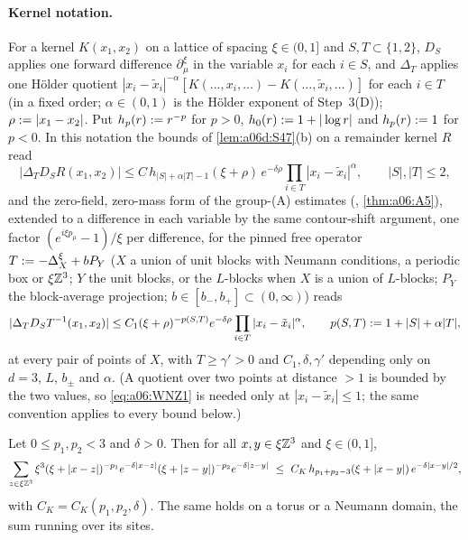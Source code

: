 \paragraph{Kernel notation.} For a kernel $K(x_1,x_2)$ on a lattice of spacing $\xi\in(0,1]$ and $S,T\subset\{1,2\}$, $D_S$ applies one forward difference $\partial^\xi_\mu$ in the variable $x_i$ for each $i\in S$, and $\Delta_T$ applies one H\"older quotient $|x_i-\tilde x_i|^{-\alpha}[K(\dots,x_i,\dots)-K(\dots,\tilde x_i,\dots)]$ for each $i\in T$ (in a fixed order; $\alpha\in(0,1)$ is the H\"older exponent of Step~3(D)); $\rho:=|x_1-x_2|$. Put $h_p(r):= r^{-p}$ for $p>0$, $h_0(r):=1+|\log r|$ and $h_p(r):=1$ for $p<0$. In this notation the bounds of \cref{lem:a06d:S47}(b) on a remainder kernel $R$ read
\begin{equation}\label{eq:a06:WNR}
|\Delta_TD_SR(x_1,x_2)|\le C\,h_{|S|+\alpha|T|-1}(\xi+\rho)\,e^{-\delta\rho}\prod_{i\in T}|x_i-\tilde x_i|^\alpha,\qquad|S|,|T|\le2,
\end{equation}
and the zero-field, zero-mass form of the group-(A) estimates (\cite[Lemma~2.4, (2.35)--(2.36)]{Ba4}, \cref{thm:a06:A5}), extended to a difference in each variable by the same contour-shift argument, one factor $(e^{i\xi p_\mu}-1)/\xi$ per difference, for the pinned free operator $T:=-\Delta^\xi_X+bP_Y$ ($X$ a union of unit blocks with Neumann conditions, a periodic box or $\xi\mathbb Z^3$; $Y$ the unit blocks, or the $L$-blocks when $X$ is a union of $L$-blocks; $P_Y$ the block-average projection; $b\in[b_-,b_+]\subset(0,\infty)$) reads
\begin{equation}\label{eq:a06:WNZ1}
|\Delta_TD_ST^{-1}(x_1,x_2)|\le C_1(\xi+\rho)^{-p(S,T)}e^{-\delta\rho}\prod_{i\in T}|x_i-\tilde x_i|^\alpha,\qquad p(S,T):=1+|S|+\alpha|T|,
\end{equation}
at every pair of points of $X$, with $T\ge\gamma'>0$ and $C_1,\delta,\gamma'$ depending only on $d=3$, $L$, $b_\pm$ and $\alpha$. (A quotient over two points at distance $>1$ is bounded by the two values, so \eqref{eq:a06:WNZ1} is needed only at $|x_i-\tilde x_i|\le1$; the same convention applies to every bound below.)

\begin{lemma}\label{lem:a06:WNK}
Let $0\le p_1,p_2<3$ and $\delta>0$. Then for all $x,y\in\xi\mathbb Z^3$ and $\xi\in(0,1]$,
\[
\sum_{z\in\xi\Z^3}\xi^3(\xi+|x-z|)^{-p_1}e^{-\delta|x-z|}(\xi+|z-y|)^{-p_2}e^{-\delta|z-y|}\ \le\ C_K\,h_{p_1+p_2-3}(\xi+|x-y|)\,e^{-\delta|x-y|/2},
\]
with $C_K=C_K(p_1,p_2,\delta)$. The same holds on a torus or a Neumann domain, the sum running over its sites.
\end{lemma}

